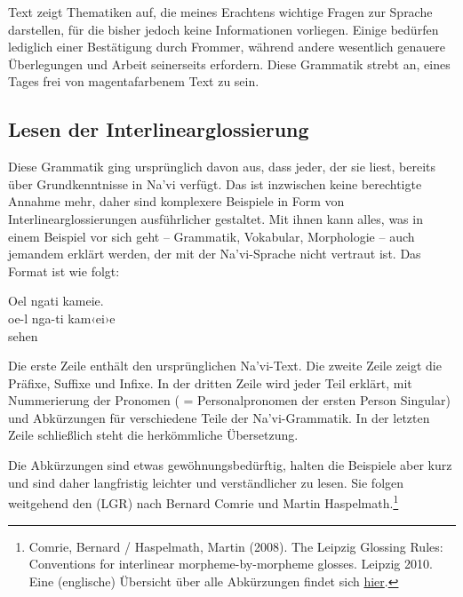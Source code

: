 Text  zeigt Thematiken auf, die meines Erachtens wichtige Fragen zur Sprache darstellen, für die bisher jedoch keine Informationen vorliegen. Einige bedürfen lediglich einer Bestätigung durch Frommer, während andere wesentlich genauere Überlegungen und
Arbeit seinerseits erfordern. Diese Grammatik strebt an, eines Tages frei von magentafarbenem Text zu sein.

\subsection{Lesen der Interlinearglossierung}
Diese Grammatik ging ursprünglich davon aus, dass jeder, der sie liest, bereits über Grundkenntnisse in Na'vi verfügt. Das ist inzwischen keine berechtigte Annahme mehr, daher sind komplexere Beispiele in Form von Interlinearglossierungen ausführlicher gestaltet. Mit ihnen kann alles, was in einem Beispiel vor sich geht -- Grammatik, Vokabular, Morphologie -- auch jemandem erklärt werden, der mit der Na'vi-Sprache nicht vertraut ist. Das Format ist wie folgt:

\begin{interlin}
	\glll Oel ngati kameie. \\
	oe-l nga-ti kam‹ei›e \\
	  sehen \\
\end{interlin}

\noindent Die erste Zeile enthält den ursprünglichen Na'vi-Text. Die zweite Zeile zeigt die Präfixe, Suffixe und Infixe. In der dritten Zeile wird jeder Teil erklärt, mit Nummerierung der Pronomen ( = Personalpronomen der ersten Person Singular) und Abkürzungen für verschiedene Teile der Na'vi-Grammatik. In der letzten Zeile schließlich steht die herkömmliche Übersetzung. 

Die Abkürzungen sind etwas gewöhnungsbedürftig, halten die Beispiele aber kurz und sind daher langfristig leichter und verständlicher zu lesen. Sie folgen weitgehend den  (LGR) nach Bernard Comrie und Martin Haspelmath.\footnote{Comrie, Bernard / Haspelmath, Martin (2008). The Leipzig Glossing Rules: Conventions for interlinear morpheme-by-morpheme glosses. Leipzig 2010. Eine (englische) Übersicht über alle Abkürzungen findet sich \href{https://en.wikipedia.org/wiki/List_of_glossing_abbreviations}{hier}.}

